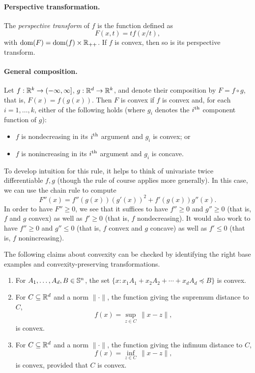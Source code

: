 \paragraph{Perspective transformation.} 

The \emph{perspective transform} of $f$ is the function defined as
\[
F(x,t) = t f(x/t),
\]
with $\operatorname{dom}(F) = \operatorname{dom}(f) \times \mathbb{R}_{++}$. If $f$ is convex, then so is its
perspective transform. 

\paragraph{General composition.} 

Let $f : \mathbb{R}^k \to (-\infty, \infty]$, $g : \mathbb{R}^d \to \mathbb{R}^k$, and denote their
composition by $F = f \circ g$, that is, $F(x) = f(g(x))$. Then $F$ is convex if
$f$ is convex and, for each $i=1,\ldots,k$, either of the following holds (where
$g_i$ denotes the $i^{\textnormal{th}}$ component function of $g$): 
\begin{itemize}
\item $f$ is nondecreasing in its $i^{\textnormal{th}}$ argument and $g_i$ is convex; or
\item $f$ is nonincreasing in its $i^{\textnormal{th}}$ argument and $g_i$ is concave.
\end{itemize} 

To develop intuition for this rule, it helps to think of univariate twice
differentiable $f,g$ (though the rule of course applies more generally). In this
case, we can use the chain rule to compute
\[
F''(x) = f''(g(x)) (g'(x))^2 + f'(g(x)) g''(x).
\]
In order to have $F'' \geq 0$, we see that it suffices to have $f'' \geq 0$ and
$g'' \geq 0$ (that is, $f$ and $g$ convex) as well as $f' \geq 0$ (that is, $f$
nondecreasing). It would also work to have $f'' \geq 0$ and $g'' \leq 0$ (that
is, $f$ convex and $g$ concave) as well as $f' \leq 0$ (that is, $f$
nonincreasing).

\medskip

\begin{Example}
The following claims about convexity can be checked by identifying   
the right base examples and convexity-preserving transformations. 

\begin{enumerate}[label=\alph*.]
\item For $A_1,\ldots,A_d,B \in \mathbb{S}^n$, the set $\{x : x_1 A_1 + x_2 A_2 +
  \cdots + x_d A_d \preceq B \}$ is convex.  

\item For $C \subseteq \mathbb{R}^d$ and a norm $\|\cdot\|$, the function giving the
  supremum distance to $C$,
\[
f(x) = \sup_{z \in C} \, \|x - z\|,
\]
is convex.

\item For $C \subseteq \mathbb{R}^d$ and a norm $\|\cdot\|$, the function giving the
  infimum distance to $C$,
\[
f(x) = \inf_{z \in C} \, \|x - z\|,
\]
is convex, provided that $C$ is convex.
\end{enumerate}
\end{Example}

